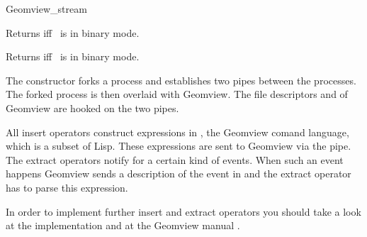 \begin{ccClass}{Geomview_stream}
\begin{ccAdvanced}
{Returns  iff \ccVar\ is in binary mode.}

{Returns  iff \ccVar\ is in binary mode.}


\end{ccAdvanced}


\ccImplementation

The constructor forks a process and establishes two pipes between the
processes. The forked process is then overlaid with Geomview. The
file descriptors  and  of Geomview are hooked
on the two pipes.

All insert operators construct expressions in , the Geomview
comand language, which is a subset of {\sc Lisp}. These expressions
are sent to Geomview via the pipe. The extract operators notify 
for a certain kind of events. When such an event happens Geomview
sends a description of the event in  and the extract operator has
to parse this expression.

In order to implement further insert and extract operators you should
take a look at the implementation \cite{f-higso-97} and at the Geomview
manual \cite{p-gmgv16-96}.
\end{ccClass}

